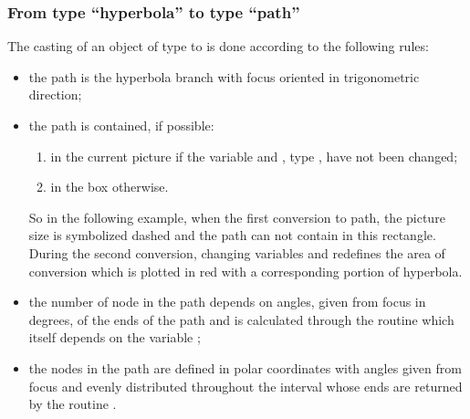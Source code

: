 \documentclass[pdftex]{article}
\begin{document}
\subsubsection{From type ``hyperbola'' to type ``path''}
The casting of an object  of type  to 
is done according to the following rules:
\begin{itemize}
\item the path is the hyperbola branch with focus 
  oriented in trigonometric direction;
\item the path is contained, if possible:
  \begin{enumerate}
  \item in the current picture if the variable 
    and , type , have not been changed;
  \item in the box  otherwise.
  \end{enumerate}
    So in the following example, when the first conversion to path,
  the picture size is symbolized dashed and the path can not contain in
  this rectangle. During the second conversion, changing
  variables  and  redefines the area of
  conversion which is plotted in red with a corresponding portion of
  hyperbola.
\item the number of node in the path depends on angles, given from
  focus in degrees, of the ends of the path and is calculated through the routine
  \linebreak
  which itself depends on the variable
  ;
\item the nodes in the path are defined in polar coordinates with
  angles given from focus  and evenly distributed throughout
  the interval whose ends are returned by the routine
  \linebreak{}%
  .
\end{itemize}
\end{document}
